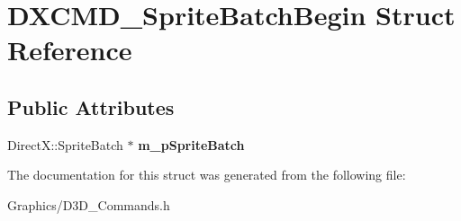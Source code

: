 \hypertarget{structDXCMD__SpriteBatchBegin}{}\section{D\+X\+C\+M\+D\+\_\+\+Sprite\+Batch\+Begin Struct Reference}
\label{structDXCMD__SpriteBatchBegin}
\subsection*{Public Attributes}
\begin{DoxyCompactItemize}
\item 
\mbox{\label{structDXCMD__SpriteBatchBegin_a2b11ccfa30f16670210fd7d192131742}} 
Direct\+X\+::\+Sprite\+Batch $\ast$ {\bfseries m\+\_\+p\+Sprite\+Batch}
\end{DoxyCompactItemize}


The documentation for this struct was generated from the following file\+:\begin{DoxyCompactItemize}
\item 
Graphics/D3\+D\+\_\+\+Commands.\+h\end{DoxyCompactItemize}

